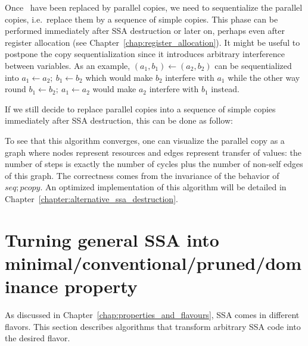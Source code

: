 Once \phiops\ have been replaced by parallel copies, we need to sequentialize the parallel copies, i.e.\ replace them by a sequence of simple copies. This phase can be performed immediately after SSA destruction or later on, perhaps even after register allocation (see Chapter~\ref{chap:register_allocation}). It might be useful to postpone the copy sequentialization since it introduces arbitrary interference between variables. As an example, $(a_1,b_1)\gets (a_2,b_2)$ can be sequentialized into $a_1\gets a_2;\ b_1\gets b_2$ which would make $b_2$ interfere with $a_1$ while the other way round $b_1\gets b_2;\ a_1\gets a_2$ would make $a_2$ interfere with $b_1$ instead.

If we still decide to replace parallel copies into a sequence of simple copies immediately after SSA destruction, this can be done as follow:

\begin{algorithm}
\end{algorithm}

To see that this algorithm converges, one can visualize the parallel copy as a graph where nodes represent resources and edges represent transfer of values: the number of steps is exactly the number of cycles plus the number of non-self edges of this graph. The correctness comes from the invariance of the behavior of $seq; pcopy$. An optimized implementation of this algorithm will be detailed in Chapter~\ref{chapter:alternative_ssa_destruction}.


\section{Turning general SSA into minimal/conventional/pruned/dominance property}
\label{section:classical_construction_algorithm:turning}
As discussed in Chapter~\ref{chap:properties_and_flavours},
SSA comes in different flavors. 
This section describes algorithms that transform
arbitrary SSA code
into the desired flavor.


